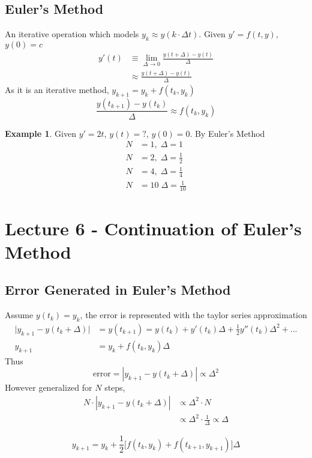 \documentclass[a6paper]{article}
\theoremstyle{definition}
\newtheorem{example}{Example}
\theoremstyle{plain}
\theoremstyle{remark}
\begin{document}
\subsection{Euler's Method}
An iterative operation which models $ y_k \approx y(k\cdot \Delta t)$. Given
$ y' = f(t,y) $, $ y(0) = c$ 
\begin{align}
  y'(t) &\equiv \lim_{\Delta \to 0} \frac{y(t+\Delta) - y(t)}{\Delta}\\ &\approx \frac{y(t+\Delta) - y(t)}{\Delta}
\end{align}
As it is an iterative method, $ y_{k+1} = y_{k} + f(t_k, y_k) $
$$ \frac{y(t_{k+1})-y(t_k)}{\Delta} \approx f(t_k, y_k) $$
\begin{example}
  Given $ y' = 2t $, $ y(t) = ? $, $ y(0) = 0 $. By Euler's Method
  \begin{align}
    N &= 1, \; \Delta = 1 \\
    N &= 2, \; \Delta = \frac{1}{2}\\
    N &= 4, \; \Delta = \frac{1}{4}\\
    N &= 10 \; \Delta = \frac{1}{10}
  \end{align}
\end{example}

\section{Lecture 6 - Continuation of Euler's Method}
\subsection{Error Generated in Euler's Method}
Assume $ y(t_k) = y_k $, the error is represented with the taylor series
approximation 
\begin{align*}
  \Big | y_{k+1} - y(t_k + \Delta) \Big | &= y(t_{k+1}) = y(t_k)
+ y'(t_k)\Delta + \frac{1}{2}y''(t_k) \Delta^2 + ... \\
  y_{k+1} &= y_k + f(t_k, y_k)\Delta
\end{align*}
Thus $$ \text{error} = |y_{k+1} - y(t_k + \Delta)| \propto \Delta^2 $$
However generalized for $ N $ steps,
\begin{align*}
  N\cdot|y_{k+1} - y(t_k + \Delta)| &\propto \Delta^2 \cdot N \\
				    &\propto \Delta^2 \cdot \frac{1}{\Delta}
				    \propto \Delta
\end{align*}

$$ y_{k+1} = y_k + \frac{1}{2}\Big[f(t_k, y_k) + f(t_{k+1}, y_{k+1}) \Big]
\Delta$$
\end{document}
